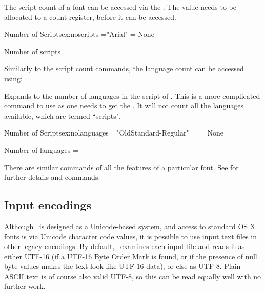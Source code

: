 \CMDI{\XeTeXOTcountscripts}

The script count of a font can be accessed via the . The value needs to
be allocated to a count register, before it can be accessed.

\begin{texexample}{Number of Scripts}{ex:noscripts}
\font\testfont="Arial" 
\scriptcount=\XeTeXOTcountscripts\testfont
\ifnum{} \noindent None\par\fi

Number of scripts = \the\scriptcount
\end{texexample}

Similarly to the script count commands, the language count can be accessed using:

\CMDI{\XeTeXOTcountlanguages}

Expands to the number of languages in the script of . This is a more complicated command to use as one needs to get the . It will not count all the languages available, which are termed ``scripts".


\begin{texexample}{Number of Scripts}{ex:nolanguages}
\font\testfont="OldStandard-Regular" 
\scripttag=\XeTeXOTscripttag{}
\langcount=\XeTeXOTcountlanguages\testfont\scripttag
\ifnum{} \noindent None\par\fi

Number of languages = \the\langcount
\end{texexample}

There are similar commands of all the features of a particular font.
See \citet{xetexreference} for further details and commands. 

\subsection{Input encodings}
\label{sec:encoding}

Although \XeTeX\ is designed as a Unicode-based system, and access to standard OS X fonts is via Unicode character code values, it is possible to use input text files in other legacy encodings. By default, \XeTeX\ examines each input file and reads it as either UTF-16 (if a UTF-16 Byte Order Mark is found, or if the presence of null byte values makes the text look like UTF-16 data), or else as UTF-8. Plain ASCII text is of course also valid UTF-8, so this can be read equally well with no further work.

